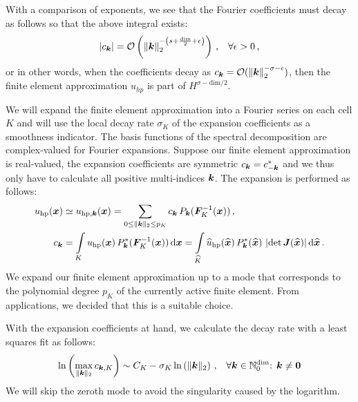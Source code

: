 With a comparison of exponents, we see that the Fourier coefficients must decay as follows so that the above integral exists:
\begin{align}
|c_\tuple{k}| = \mathcal{O}\left( \left\|\tuple{k}\right\|_2^{-\left(s + \frac{\text{dim}}{2} + \epsilon \right)} \right) \,\text{,} \quad \forall \epsilon > 0 \,\text{,}
\end{align}
or in other words, when the coefficients decay as $c_\tuple{k} = \mathcal{O}( \left\|\tuple{k}\right\|_2^{-\sigma-\epsilon} )$, then the finite element approximation $u_{hp}$ is part of $H^{\sigma - \text{dim}/2}$. \textcite{dealiistep-27}

We will expand the finite element approximation into a Fourier series on each cell $K$ and will use the local decay rate $\sigma_K$ of the expansion coefficients as a smoothness indicator. The basis functions of the spectral decomposition are complex-valued for Fourier expansions. Suppose our finite element approximation is real-valued, the expansion coefficients are symmetric $c_\tuple{k} = c_{-\tuple{k}}^*$ and we thus only have to calculate all positive multi-indices $\tuple{k}$. The expansion is performed as follows:
\begin{align}
u_{\text{hp}}(\vec{x}) &\simeq u_{\text{hp}, \tuple{k}}(\vec{x}) = \sum\limits_{0 \leq \|\tuple{k}\|_2 \leq p_K} c_\tuple{k} \, P_\tuple{k}(\mat{F}_K^{-1}(\vec{x})) \,\text{,} \\
c_\tuple{k} &=
\int\limits_K u_{\text{hp}}(\vec{x}) \, P_\tuple{k}^\ast(\mat{F}_K^{-1}(\vec{x})) \differential{\vec{x}} =
\int\limits_{\widehat{K}} \widehat{u}_{\text{hp}}(\vec{\widehat{x}}) \, P_\tuple{k}^\ast(\vec{\widehat{x}}) \, \left|\det \mat{J}(\vec{\widehat{x}})\right| \differential{\vec{\widehat{x}}} \,\text{.}
\end{align}
We expand our finite element approximation up to a mode that corresponds to the polynomial degree $p_K$ of the currently active finite element. From applications, we decided that this is a suitable choice. \textcite{dealiifourier}

With the expansion coefficients at hand, we calculate the decay rate with a least squares fit as follows:
\begin{align}
\ln\left( \max\limits_{\|\tuple{k}\|_2} c_{\tuple{k}, K} \right) \sim C_K - \sigma_K  \ln\left( \|\tuple{k}\|_2 \right) \,\text{,} \quad \forall \tuple{k} \in \mathbb{N}_0^\text{dim} \text{: } \tuple{k} \neq \vec{0}
\end{align}
We will skip the zeroth mode to avoid the singularity caused by the logarithm.

